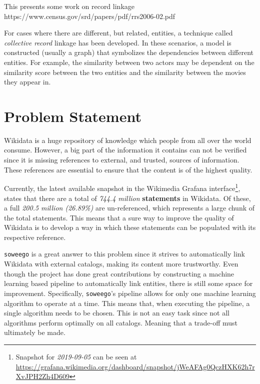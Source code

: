 \documentclass[epsfig,a4paper,11pt,titlepage,twoside,openany]{book}
\begin{document}
This presents some work on record linkage
https://www.census.gov/srd/papers/pdf/rrs2006-02.pdf


For cases where there are different, but related, entities, a technique called \textit{collective record} \cite{Kalashnikov2006_collective_graph,Dong2005_reference_reconciliation,bhattacharya07_collec_entit_resol_relat_data} linkage has been developed. In these scenarios,  a model is constructed (usually a graph) that symbolizes the dependencies between  different entities. For example, the similarity between two actors may be dependent on the similarity score between the two entities and the similarity between the  movies they appear in.


\chapter{Problem Statement}
\label{chap:problem-statement}

Wikidata is a huge repository of knowledge which people from all over the world consume. However, a big part of the information it contains can not be verified since it is missing references to external, and trusted, sources of information. These references are essential to ensure that the content is of the highest quality. 

Currently, the latest available snapshot in the Wikimedia Grafana interface\footnote{Snapshot for \textit{2019-09-05} can be seen at \url{https://grafana.wikimedia.org/dashboard/snapshot/jWeAFAg0QczHXK62h7rXvJPH2Zh4D609}}, states that there are a total of \textit{744.4 million} \textbf{statements} in Wikidata. Of these, a full \textit{200.5 million (26.89\%)} are un-referenced, which represents a large chunk of the total statements. This means that a sure way to improve the quality of Wikidata is to develop a way in which these statements can be populated with its respective reference.

\texttt{soweego} is a great answer to this problem since it strives to automatically link Wikidata with external catalogs, making its content more trustworthy. Even though the project has done great contributions by constructing a machine learning based pipeline to automatically link entities, there is still some space for improvement. Specifically, \texttt{soweego}'s pipeline allows for only one machine learning algorithm to operate at a time. This means that, when executing the pipeline, a single algorithm needs to be chosen. This is not an easy task since not all algorithms perform optimally on all catalogs. Meaning that a trade-off must ultimately be made.
\end{document}
